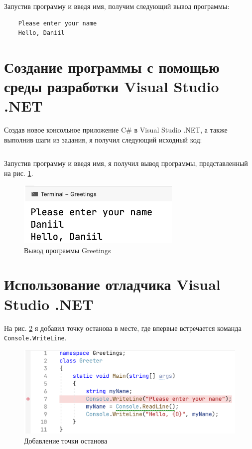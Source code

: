 \documentclass[a4paper,14pt]{extarticle}
\numberwithin{figure}{section}
\begin{document}
Запустив программу и введя имя, получим следующий вывод программы:
\begin{verbatim}
    Please enter your name
    Hello, Daniil
\end{verbatim}

\section{Создание программы с помощью среды разработки Visual Studio .NET}

Создав новое консольное приложение C\# в Visual Studio .NET, а также выполнив шаги из задания, я получил следующий исходный код:
\inputminted{csharp}{../Greetings/Greetings/Program.cs}

Запустив программу и введя имя, я получил вывод программы, представленный на рис. \ref{fig:task-2}.
\begin{figure}[H]
    \centering
    \includegraphics[width=0.7\textwidth]{images/task-2.png}
    \caption{Вывод программы Greetings}
    \label{fig:task-2}
\end{figure}

\section{Использование отладчика Visual Studio .NET}

На рис. \ref{fig:task-3-1} я добавил точку останова в месте, где впервые встречается команда \texttt{Console.WriteLine}.

\begin{figure}[H]
    \centering
    \includegraphics[width=\textwidth]{images/task-3-1.png}
    \caption{Добавление точки останова}
    \label{fig:task-3-1}
\end{figure}
\end{document}
